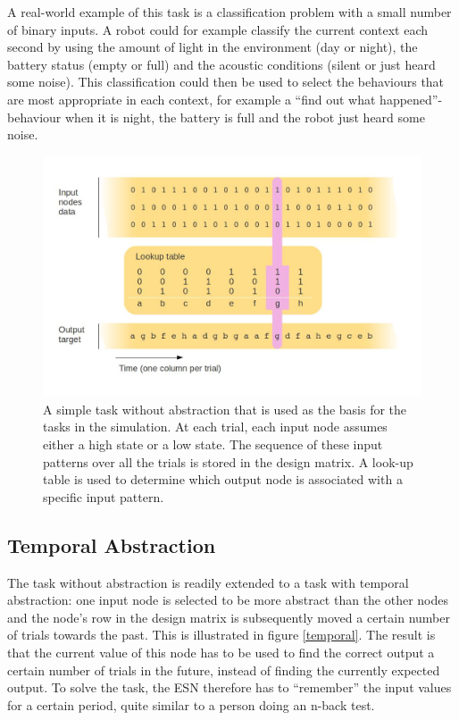\documentclass[10pt,a4paper]{report}
\begin{document}
A real-world example of this task is a classification problem with a small number of binary inputs. A robot could for example classify the current context each second by using the amount of light in the environment (day or night), the battery status (empty or full) and the acoustic conditions (silent or just heard some noise). This classification could then be used to select the behaviours that are most appropriate in each context, for example a ``find out what happened''-behaviour when it is night, the battery is full and the robot just heard some noise.

\begin{figure}[bthp]
\includegraphics[width=\textwidth]{figures/tasknoabstr.jpg}
\caption{A simple task without abstraction that is used as the basis for the tasks in the simulation. At each trial, each input node assumes either a high state or a low state. The sequence of these input patterns over all the trials is stored in the design matrix. A look-up table is used to determine which output node is associated with a specific input pattern. }
\label{abstractionless}
\end{figure}

\subsection*{Temporal Abstraction}
The task without abstraction is readily extended to a task with temporal abstraction: one input node is selected to be more abstract than the other nodes and the node's row in the design matrix is subsequently moved a certain number of trials towards the past. This is illustrated in figure \ref{temporal}. The result is that the current value of this node has to be used to find the correct output a certain number of trials in the future, instead of finding the currently expected output. To solve the task, the ESN therefore has to ``remember'' the input values for a certain period, quite similar to a person doing an n-back test. 
\end{document}
